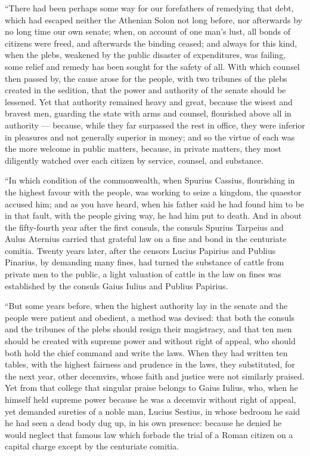  ``There had been perhaps some way for our forefathers of remedying that debt, which had escaped neither the Athenian Solon not long before, nor afterwards by no long time our own senate; when, on account of one man's lust, all bonds of citizens were freed, and afterwards the binding ceased; and always for this kind, when the plebs, weakened by the public disaster of expenditures, was failing, some relief and remedy has been sought for the safety of all. With which counsel then passed by, the cause arose for the people, with two tribunes of the plebs created in the sedition, that the power and authority of the senate should be lessened. Yet that authority remained heavy and great, because the wisest and bravest men, guarding the state with arms and counsel, flourished above all in authority --- because, while they far surpassed the rest in office, they were inferior in pleasures and not generally superior in money; and so the virtue of each was the more welcome in public matters, because, in private matters, they most diligently watched over each citizen by service, counsel, and substance.

 ``In which condition of the commonwealth, when Spurius Cassius, flourishing in the highest favour with the people, was working to seize a kingdom, the quaestor accused him; and as you have heard, when his father said he had found him to be in that fault, with the people giving way, he had him put to death. And in about the fifty-fourth year after the first consuls, the consuls Spurius Tarpeius and Aulus Aternius carried that grateful law on a fine and bond in the centuriate comitia. Twenty years later, after the censors Lucius Papirius and Publius Pinarius, by demanding many fines, had turned the substance of cattle from private men to the public, a light valuation of cattle in the law on fines was established by the consuls Gaius Iulius and Publius Papirius.

 ``But some years before, when the highest authority lay in the senate and the people were patient and obedient, a method was devised: that both the consuls and the tribunes of the plebs should resign their magistracy, and that ten men should be created with supreme power and without right of appeal, who should both hold the chief command and write the laws. When they had written ten tables, with the highest fairness and prudence in the laws, they substituted, for the next year, other decemvirs, whose faith and justice were not similarly praised. Yet from that college that singular praise belongs to Gaius Iulius, who, when he himself held supreme power because he was a decemvir without right of appeal, yet demanded sureties of a noble man, Lucius Sestius, in whose bedroom he said he had seen a dead body dug up, in his own presence: because he denied he would neglect that famous law which forbade the trial of a Roman citizen on a capital charge except by the centuriate comitia.

